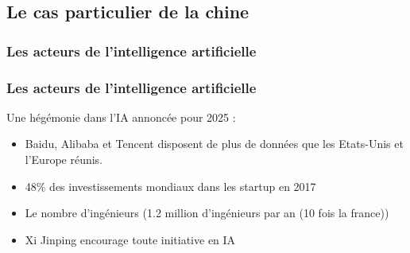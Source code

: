 \subsection{Le cas particulier de la chine}



\begin{frame}
  \frametitle{Les acteurs de l'intelligence artificielle}
\end{frame}

\begin{frame}
  \frametitle{Les acteurs de l'intelligence artificielle}
  Une hégémonie dans l'IA annoncée pour 2025 :
  \begin{itemize}
  \item Baidu, Alibaba et Tencent disposent de plus de données que les Etats-Unis et l’Europe réunis.
  \item 48\% des investissements mondiaux dans les startup en 2017
  \item Le nombre d'ingénieurs (1.2 million d'ingénieurs par an (10 fois la france))
  \item Xi Jinping encourage toute initiative en IA
  \end{itemize}
\end{frame}

